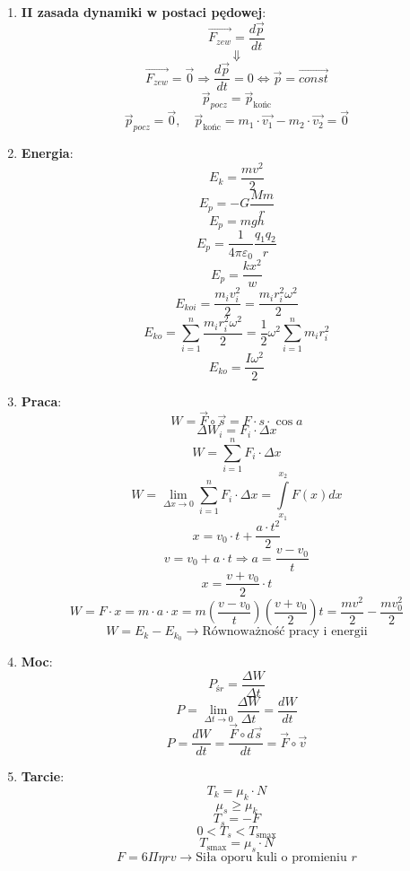 \documentclass{article}
\begin{document}
\begin{enumerate}
		\item \textbf{II zasada dynamiki w postaci pędowej}:
		\[
		\overrightarrow{F_{zew}} = \frac{d \vec{p}}{dt}
		\]
		\[
		\Downarrow
		\]
		\[
		\overrightarrow{F_{zew}} = \vec{0} \Rightarrow \frac{d \vec{p}}{dt} = 0 \Leftrightarrow \vec{p} = \overrightarrow{const}
		\]
		\[
		\vec{p}_{pocz} = \vec{p}_{\text{końc}}
		\]
		\[
		\vec{p}_{pocz} = \vec{0}, \quad \vec{p}_{\text{końc}}= m_1 \cdotp \overrightarrow{v_1} - m_2 \cdotp \overrightarrow{v_2} = \vec{0}
		\]
		
		\item \textbf{Energia}:
		\[
		E_k = \frac{mv^2}{2}
		\]
		\[
		E_p = -G \frac{Mm}{r}
		\]
		\[
		E_p = mgh
		\]
		\[
		E_p = \frac{1}{4 \pi \varepsilon_0} \frac{q_1 q_2}{r}
		\]
		\[
		E_p = \frac{kx^2}{w}
		\]
		\[
		E_{koi} = \frac{m_i v_i^2}{2} = \frac{m_i r_i^2 \omega^2}{2}
		\]
		\[
		E_{ko} = \sum\limits_{i = 1}^n \frac{m_i r_i^2 \omega^2}{2} = \frac{1}{2} \omega^2 \sum\limits_{i = 1}^n m_i r_i^2
		\]
		\[
		E_{ko} = \frac{I \omega^2}{2}
		\]
		\item \textbf{Praca}:
		\[
		W = \vec{F} \circ \vec{s} = F \cdot s \cdot \cos a
		\]
		\[
		\Delta W_i = F_i \cdot \Delta x
		\]
		\[
		W = \sum\limits_{i = 1}^n F_i \cdot \Delta x
		\]
		\[
		W = \lim\limits_{\Delta x \rightarrow 0} \sum\limits_{i = 1}^n F_i \cdot \Delta x = \int\limits_{x_1}^{x_2} F(x)dx
		\]
		\[
		x = v_0 \cdot t + \frac{a \cdot t^2}{2}
		\]
		\[
		v = v_0 + a \cdot t \Rightarrow a = \frac{v - v_0}{t}
		\]
		\[
		x = \frac{v + v_0}{2} \cdot t
		\]
		\[
		W = F \cdot x = m \cdot a \cdot x = m \left( \frac{v - v_0}{t} \right) \left( \frac{v + v_0}{2} \right)t = \frac{mv^2}{2} - \frac{mv_0^2}{2}
		\]
		\[
		W = E_k - E_{k_0} \longrightarrow \text{Równoważność pracy i energii}
		\]
		\item \textbf{Moc}:
		\[
		P_{śr} = \frac{\Delta W}{\Delta t}
		\]
		\[
		P = \lim\limits_{\Delta t \rightarrow 0} \frac{\Delta W}{\Delta t} = \frac{dW}{dt}
		\]
		\[
		P = \frac{dW}{dt} = \frac{\vec{F} \circ d \vec{s}}{dt} = \vec{F} \circ \vec{v}
		\]
		\item \textbf{Tarcie}:
		\[
		T_k = \mu_k \cdot N
		\]
		\[
		\mu_s \geq \mu_k
		\]
		\[
		T_s = -F
		\]
		\[
		0 < T_s < T_{\text{smax}}
		\]
		\[
		T_{\text{smax}} = \mu_s \cdot N
		\]
		\[
		F = 6 \Pi \eta r v \longrightarrow \text{Siła oporu kuli o promieniu } r
\]
\end{enumerate}
\end{document}
